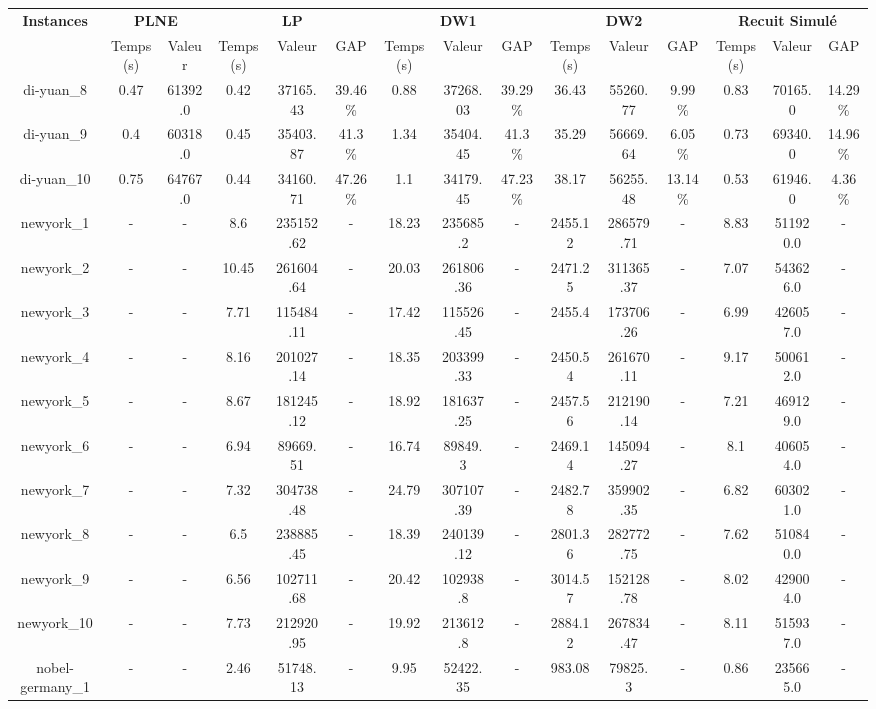 \documentclass[main.tex]{subfiles}
\begin{document}
\begin{landscape}
\begin{table}[h]
    \centering
    \begin{tabular}{c|cc|ccc|ccc|ccc|ccc}
	\hline	
	\textbf{Instances} &\multicolumn{2}{c}{\textbf{PLNE}} &\multicolumn{3}{c}{\textbf{LP}} &\multicolumn{3}{c}{\textbf{DW1}} &\multicolumn{3}{c}{\textbf{DW2}} &\multicolumn{3}{c}{\textbf{Recuit Simulé}}\\
	 &Temps(s) &Valeur &Temps(s) &Valeur &GAP &Temps(s) &Valeur &GAP &Temps(s) &Valeur &GAP &Temps(s) &Valeur &GAP\\

	\hline
	di-yuan\_8 &0.47 &61392.0 &0.42 &37165.43 &39.46\% &0.88 &37268.03 &39.29\% &36.43 &55260.77 &9.99\% &0.83 &70165.0 &14.29\%\\
	di-yuan\_9 &0.4 &60318.0 &0.45 &35403.87 &41.3\% &1.34 &35404.45 &41.3\% &35.29 &56669.64 &6.05\% &0.73 &69340.0 &14.96\%\\
	di-yuan\_10 &0.75 &64767.0 &0.44 &34160.71 &47.26\% &1.1 &34179.45 &47.23\% &38.17 &56255.48 &13.14\% &0.53 &61946.0 &4.36\%\\
	newyork\_1 &- &- &8.6 &235152.62 &- &18.23 &235685.2 &- &2455.12 &286579.71 &- &8.83 &511920.0 &-\\
	newyork\_2 &- &- &10.45 &261604.64 &- &20.03 &261806.36 &- &2471.25 &311365.37 &- &7.07 &543626.0 &-\\
	newyork\_3 &- &- &7.71 &115484.11 &- &17.42 &115526.45 &- &2455.4 &173706.26 &- &6.99 &426057.0 &-\\
	newyork\_4 &- &- &8.16 &201027.14 &- &18.35 &203399.33 &- &2450.54 &261670.11 &- &9.17 &500612.0 &-\\
	newyork\_5 &- &- &8.67 &181245.12 &- &18.92 &181637.25 &- &2457.56 &212190.14 &- &7.21 &469129.0 &-\\
	newyork\_6 &- &- &6.94 &89669.51 &- &16.74 &89849.3 &- &2469.14 &145094.27 &- &8.1 &406054.0 &-\\
	newyork\_7 &- &- &7.32 &304738.48 &- &24.79 &307107.39 &- &2482.78 &359902.35 &- &6.82 &603021.0 &-\\
	newyork\_8 &- &- &6.5 &238885.45 &- &18.39 &240139.12 &- &2801.36 &282772.75 &- &7.62 &510840.0 &-\\
	newyork\_9 &- &- &6.56 &102711.68 &- &20.42 &102938.8 &- &3014.57 &152128.78 &- &8.02 &429004.0 &-\\
	newyork\_10 &- &- &7.73 &212920.95 &- &19.92 &213612.8 &- &2884.12 &267834.47 &- &8.11 &515937.0 &-\\
	nobel-germany\_1 &- &- &2.46 &51748.13 &- &9.95 &52422.35 &- &983.08 &79825.3 &- &0.86 &235665.0 &-\\

\end{tabular}
\end{table}
\end{landscape}
\end{document}
